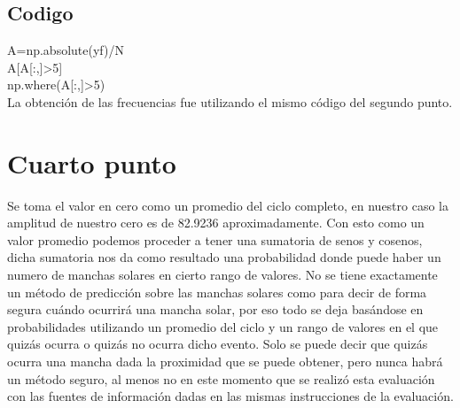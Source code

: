 \documentclass[a4paper,12pt]{article}
\begin{document}
\subsection{Codigo}
\noindent
A=np.absolute(yf)/N\\
A[A[:,]>5]\\
np.where(A[:,]>5)
\\[0.5cm]
\noindent
La obtención de las frecuencias fue utilizando el mismo código del segundo punto.

\section{Cuarto punto}
\noindent
Se toma el valor en cero como un promedio del ciclo completo, en nuestro caso la amplitud de nuestro cero es de 82.9236 aproximadamente. Con esto como un valor promedio podemos proceder a tener una sumatoria de senos y cosenos, dicha sumatoria nos da como resultado una probabilidad donde puede haber un numero de manchas solares en cierto rango de valores. No se tiene exactamente un método de predicción sobre las manchas solares como para decir de forma segura cuándo ocurrirá una mancha solar, por eso todo se deja basándose en probabilidades utilizando un promedio del ciclo y un rango de valores en el que quizás ocurra o quizás no ocurra dicho evento. Solo se puede decir que quizás ocurra una mancha dada la proximidad que se puede obtener, pero nunca habrá un método seguro, al menos no en este momento que se realizó esta evaluación con las fuentes de información dadas en las mismas instrucciones de la evaluación.
\end{document}
